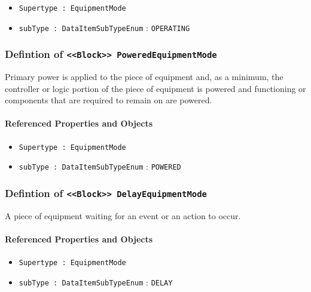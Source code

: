 \begin{itemize}
\item \texttt{Supertype : EquipmentMode}

\item \texttt{subType : DataItemSubTypeEnum} : \texttt{OPERATING}

\end{itemize}
\FloatBarrier
\subsubsection{Defintion of \texttt{<<Block>> PoweredEquipmentMode}}
  \label{type:PoweredEquipmentMode}

\FloatBarrier

Primary  power is  applied  to the  piece  of  equipment and,  as  a minimum, the controller or logic portion of the piece of equipment is powered and functioning or components that are required to remain on are powered.

\FloatBarrier
\paragraph{Referenced Properties and Objects}

\begin{itemize}
\item \texttt{Supertype : EquipmentMode}

\item \texttt{subType : DataItemSubTypeEnum} : \texttt{POWERED}

\end{itemize}
\FloatBarrier
\subsubsection{Defintion of \texttt{<<Block>> DelayEquipmentMode}}
  \label{type:DelayEquipmentMode}

\FloatBarrier

A piece of equipment waiting for an event or an action to occur.

\FloatBarrier
\paragraph{Referenced Properties and Objects}

\begin{itemize}
\item \texttt{Supertype : EquipmentMode}

\item \texttt{subType : DataItemSubTypeEnum} : \texttt{DELAY}

\end{itemize}
\FloatBarrier
